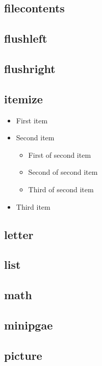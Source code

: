 \documentclass[11pt]{article}
\begin{document}
\subsection{filecontents}%

\subsection{flushleft}%

\subsection{flushright}%

\subsection{itemize}
\begin{itemize}
    \item First item
    \item Second item
        \begin{itemize}
            \item First of second item
            \item Second of second item
            \item Third of second item
        \end{itemize}
    \item Third item
\end{itemize}

\subsection{letter} %

\subsection{list} %

\subsection{math} %

\subsection{minipgae} %

\subsection{picture} %
\end{document}
